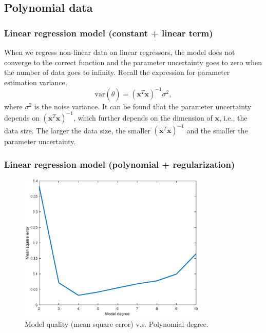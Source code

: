 \documentclass[]{article}
\begin{document}
\subsection{Polynomial  data}

\subsubsection{Linear regression model (constant + linear term)}

When we regress non-linear data on linear regressors, the model does not converge to the correct function and the parameter uncertainty goes to zero when the number of data goes to infinity. Recall the expression for parameter estimation variance,
\begin{equation}
\text{var}(\hat{\theta}) = (\mathbf{x}^T\mathbf{x})^{-1}\sigma^2,
\end{equation}
where $\sigma^2$ is the noise variance. It can be found that the parameter uncertainty depends on $(\mathbf{x}^T\mathbf{x})^{-1}$, which further depends on the dimension of $\mathbf{x}$, i.e., the data size. The larger the data size, the smaller $(\mathbf{x}^T\mathbf{x})^{-1}$ and the smaller the parameter uncertainty. 

\subsubsection{Linear regression model (polynomial + regularization)}
\begin{figure}[H]
	\caption{Model quality (mean square error) v.s. Polynomial degree.}
	\label{fig:5thorderpolynomial}
	\centering
	\includegraphics[width=0.8\textwidth]{project32b}
\end{figure}
\end{document}
